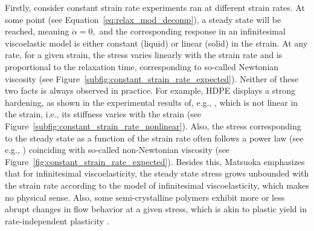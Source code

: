 Firstly, consider constant strain rate experiments ran at different strain rates.
At some point (see Equation~\eqref{eq:relax_mod_decomp}), a steady state will be reached, meaning $\dot \alpha = 0,$ and the corresponding response in an infinitesimal viscoelastic model is either constant (liquid) or linear (solid) in the strain.
At any rate, for a given strain, the stress varies linearly with the strain rate and is proportional to the relaxation time, corresponding to so-called Newtonian viscosity \citep{matsuokaThermodynamicTheoryViscoelasticity1996} (see Figure~\ref{subfig:constant_strain_rate_expected}).
Neither of these two facts is always observed in practice.
For example, HDPE displays a strong hardening, as shown in the experimental results of, e.g., \cite{gsellYieldTransientEffects1981}, which is not linear in the strain, i.e., its stiffness varies with the strain (see Figure~\eqref{subfig:constant_strain_rate_nonlinear}).
Also, the stress corresponding to the steady state as a function of the strain rate often follows a power law (see e.g.,  \cite{gsellDeterminationPlasticBehaviour1979}) coinciding with so-called non-Newtonian viscosity (see Figure~\ref{fig:constant_strain_rate_expected}).
Besides this, Matsuoka \citep{matsuokaThermodynamicTheoryViscoelasticity1996} emphasizes that for infinitesimal viscoelasticity, the steady state stress grows unbounded with the strain rate according to the model of infinitesimal viscoelasticity, which makes no physical sense.
Also, some semi-crystalline polymers exhibit more or less abrupt changes in flow behavior at a given stress, which is akin to plastic yield in rate-independent plasticity \citep{bergstromMechanicsSolidPolymers2015}.
